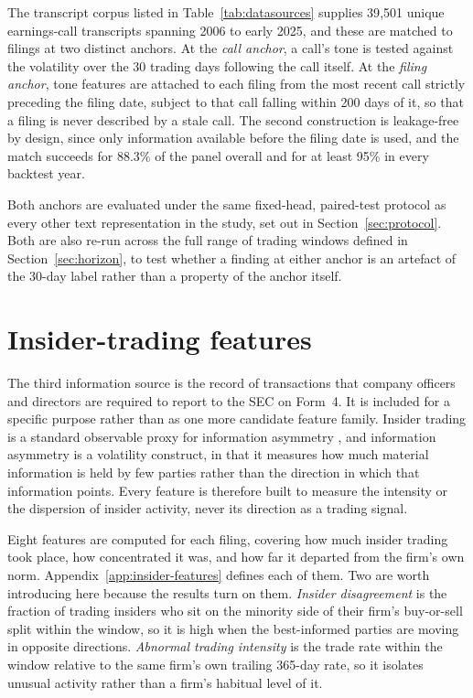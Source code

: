 \documentclass[logo,msc,ai]{infthesis}        %
\begin{document}
The transcript corpus listed in Table~\ref{tab:datasources} supplies 39{,}501 unique earnings-call transcripts spanning 2006 to early 2025, and these are matched to filings at two distinct anchors. At the \emph{call anchor}, a call's tone is tested against the volatility over the 30 trading days following the call itself. At the \emph{filing anchor}, tone features are attached to each filing from the most recent call strictly preceding the filing date, subject to that call falling within 200 days of it, so that a filing is never described by a stale call. The second construction is leakage-free by design, since only information available before the filing date is used, and the match succeeds for 88.3\% of the panel overall and for at least 95\% in every backtest year.

Both anchors are evaluated under the same fixed-head, paired-test protocol as every other text representation in the study, set out in Section~\ref{sec:protocol}. Both are also re-run across the full range of trading windows defined in Section~\ref{sec:horizon}, to test whether a finding at either anchor is an artefact of the 30-day label rather than a property of the anchor itself.

\section{Insider-trading features}
\label{sec:insider-method}
The third information source is the record of transactions that company officers and directors are required to report to the SEC on Form~4. It is included for a specific purpose rather than as one more candidate feature family. Insider trading is a standard observable proxy for information asymmetry \cite{frankel2004characteristics}, and information asymmetry is a volatility construct, in that it measures how much material information is held by few parties rather than the direction in which that information points. Every feature is therefore built to measure the intensity or the dispersion of insider activity, never its direction as a trading signal.

Eight features are computed for each filing, covering how much insider trading took place, how concentrated it was, and how far it departed from the firm's own norm. Appendix~\ref{app:insider-features} defines each of them. Two are worth introducing here because the results turn on them. \emph{Insider disagreement} is the fraction of trading insiders who sit on the minority side of their firm's buy-or-sell split within the window, so it is high when the best-informed parties are moving in opposite directions. \emph{Abnormal trading intensity} is the trade rate within the window relative to the same firm's own trailing 365-day rate, so it isolates unusual activity rather than a firm's habitual level of it.
\end{document}
